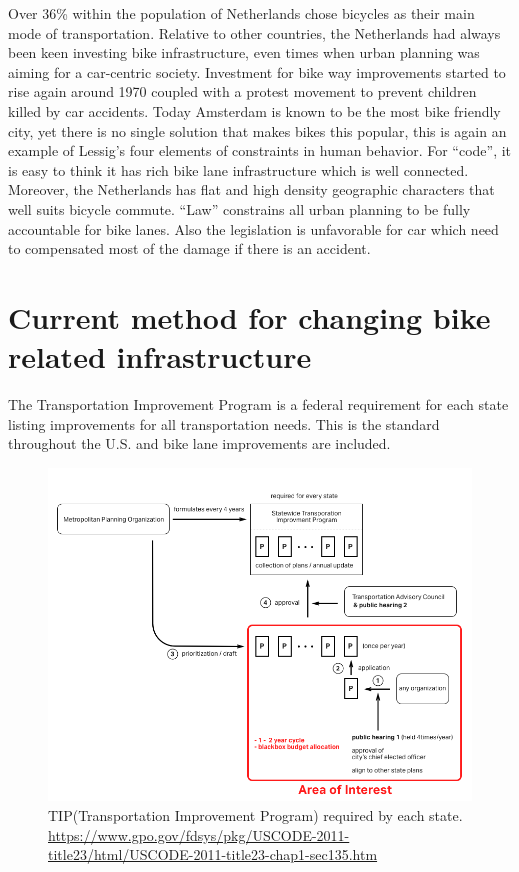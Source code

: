 Over 36\% within the population of Netherlands chose bicycles as their main mode of transportation. Relative to other countries, the Netherlands had always been keen investing bike infrastructure, even times when urban planning was aiming for a car-centric society. Investment for bike way improvements started to rise again around 1970 coupled with a protest movement to prevent children killed by car accidents. Today Amsterdam is known to be the most bike friendly city, yet there is no single solution that makes bikes this popular, this is again an example of Lessig's four elements of constraints in human behavior. For ``code'', it is easy to think it has rich bike lane infrastructure which is well connected. Moreover, the Netherlands has flat and high density geographic characters that well suits bicycle commute. ``Law'' constrains all urban planning to be fully accountable for bike lanes. Also the legislation is unfavorable for car which need to compensated most of the damage if there is an accident.  
\section{Current method for changing bike related infrastructure}
The Transportation Improvement Program is a federal requirement for each state listing improvements for all transportation needs. This is the standard throughout the U.S. and bike lane improvements are included.


\begin{figure}[!htb]
  \includegraphics{chapters/4/fig/tip_process.png}               
  \caption[TIP process]{TIP(Transportation Improvement Program) required by each state. \url{https://www.gpo.gov/fdsys/pkg/USCODE-2011-title23/html/USCODE-2011-title23-chap1-sec135.htm} 
  }
  \label{fig:tip_process}
\end{figure}

